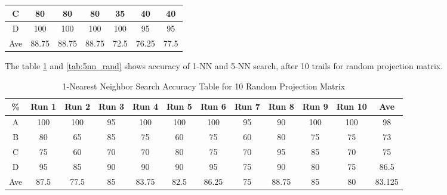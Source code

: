 \documentclass{article}
\begin{document}
\begin{table}[H]
\begin{tabular}{|c|c|c|c|c|c|c|}
		C                   & 80                                                   & 80                                                   & 80                                                   & 35                                                   & 40                                                   & 40                                                   \\ \hline
		D                   & 100                                                  & 100                                                  & 100                                                  & 100                                                  & 95                                                   & 95                                                   \\ \hline
		Ave                 & 88.75                                                & 88.75                                                & 88.75                                                & 72.5                                                 & 76.25                                                & 77.5                                                 \\ \hline
	\end{tabular}
  \end{table}

\justify The table \ref{tab:1nn_rand} and \ref{tab:5nn_rand} shows accuracy of 1-NN and 5-NN search, after 10 trails for random projection matrix. 
\begin{table}[H]
	\centering
	\caption{1-Nearest Neighbor Search Accuracy Table for 10 Random Projection Matrix}
	\label{tab:1nn_rand}
	\begin{tabular}{|c|c|c|c|c|c|c|c|c|c|c|c|}
		\hline
		\%  & Run 1 & Run 2 & Run 3 & Run 4 & Run 5 & Run 6 & Run 7 & Run 8 & Run 9 & Run 10 & Ave    \\ \hline
		A   & 100   & 100   & 95    & 100   & 100   & 100   & 95    & 90    & 100   & 100    & 98     \\ \hline
		B   & 80    & 65    & 85    & 75    & 60    & 75    & 60    & 80    & 75    & 75     & 73     \\ \hline
		C   & 75    & 60    & 70    & 70    & 80    & 75    & 70    & 95    & 85    & 70     & 75     \\ \hline
		D   & 95    & 85    & 90    & 90    & 90    & 95    & 75    & 90    & 80    & 75     & 86.5   \\ \hline
		Ave & 87.5  & 77.5  & 85    & 83.75 & 82.5  & 86.25 & 75    & 88.75 & 85    & 80     & 83.125 \\ \hline
	\end{tabular}
\end{table}
\end{document}

